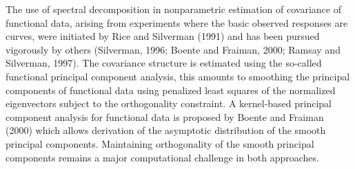 The use of spectral decomposition in nonparametric estimation of covariance of functional data, arising from experiments where the basic observed responses are curves, were initiated by Rice and Silverman (1991) and has been pursued vigorously by others (Silverman, 1996; Boente and Fraiman, 2000; Ramsay and Silverman, 1997). The covariance structure is estimated using the so-called functional principal component analysis, this amounts to smoothing the principal components of functional data using penalized least squares of the normalized eigenvectors subject to the orthogonality constraint. A kernel-based principal component analysis for functional data is proposed by Boente and Fraiman (2000) which allows derivation of the asymptotic distribution of the smooth principal components. Maintaining orthogonality of the smooth principal components remains a major computational challenge in both approaches.

